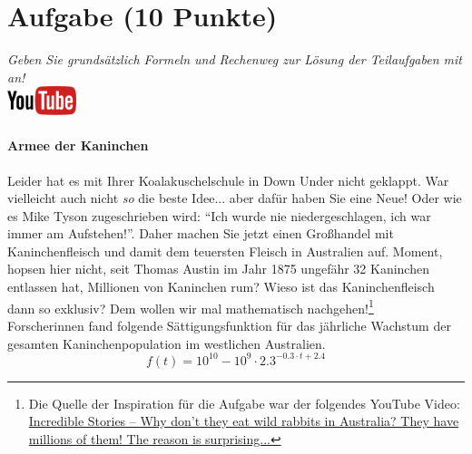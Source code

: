 \documentclass[a4paper, 9pt]{scrartcl}\usepackage[]{graphicx}\usepackage[]{xcolor}
\begin{document}
\clearpage

\section{Aufgabe \hfill (10 Punkte)}

\textit{Geben Sie grunds{\"a}tzlich Formeln und Rechenweg zur L{\"o}sung der
  Teilaufgaben mit an!} \\[1Ex]

\hfill\href{https://youtu.be/Mr6eslls4J0}{\includegraphics[width =
  2cm]{img/youtube}} %
\hspace{2Ex}

\paragraph{Armee der Kaninchen}



Leider hat es mit Ihrer Koalakuschelschule in Down Under nicht geklappt. War vielleicht
auch nicht \textit{so} die beste Idee... aber daf{\"u}r haben Sie eine Neue!
Oder wie es Mike Tyson zugeschrieben wird: "`Ich wurde nie
niedergeschlagen, ich war immer am Aufstehen!"'. Daher machen Sie jetzt
einen Gro{\ss}handel mit Kaninchenfleisch und damit dem teuersten Fleisch in
Australien auf. Moment, hopsen hier nicht, seit Thomas Austin im Jahr
1875 ungef{\"a}hr 32 Kaninchen entlassen hat,
Millionen von Kaninchen rum? Wieso ist das Kaninchenfleisch dann so
exklusiv? Dem wollen wir mal mathematisch nachgehen!\footnote{Die Quelle
  der Inspiration f{\"u}r die Aufgabe war der folgendes YouTube Video:
  \href{https://youtu.be/38fuOr3tdgc?si=Li7NL_FoByML8JtT}{ Incredible
    Stories -- Why don't they eat wild rabbits in Australia? They have
    millions of them! The reason is surprising...}}
\\

Forscherinnen fand folgende S{\"a}ttigungsfunktion f{\"u}r das j{\"a}hrliche Wachstum
der gesamten Kaninchenpopulation im westlichen Australien.
\begin{equation*}
  f(t) = \ensuremath{10^{10}} - \ensuremath{10^{9}} \cdot 2.3^{-0.3 \cdot t + 2.4}
\end{equation*}
\end{document}
